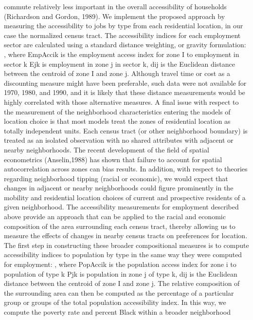 \documentclass[12pt,a4paper]{article}
\begin{document}
commute relatively less important in the overall accessibility of
households (Richardson and Gordon, 1989). We implement the
proposed approach by measuring the accessibility to jobs by type
from each residential location, in our case the normalized census
tract.  The accessibility indices for each employment sector are
calculated using a standard distance weighting, or gravity
formulation:
 ,
where   EmpAccik is the employment access index for zone I to
employment in sector k Ejk is employment in zone j in sector k,
    dij is the Euclidean distance between the centroid of zone I and zone j.
Although travel time or cost as a discounting measure might have
been preferable, such data were not available for 1970, 1980,  and
1990, and it is likely that these distance measurements would be
highly correlated with those alternative measures. A final issue
with respect to the measurement of the neighborhood
characteristics entering the models of location choice is that
most models treat the zones of residential location as totally
independent units.  Each census tract (or other neighborhood
boundary) is treated as an isolated observation with no shared
attributes with adjacent or nearby neighborhoods.  The recent
development of the field of spatial econometrics (Anselin,1988)
has shown that failure to account for spatial autocorrelation
across zones can bias results.  In addition, with respect to
theories regarding neighborhood tipping (racial or economic), we
would expect that changes in adjacent or nearby neighborhoods
could figure prominently in the mobility and residential location
choices of current and prospective residents of a given
neighborhood.  The accessibility measurements for employment
described above provide an approach that can be applied to the
racial and economic composition of the area surrounding each
census tract, thereby allowing us to measure the effects of
changes in nearby census tracts on preferences for location. The
first step in constructing these broader compositional measures is
to compute accessibility indices to population by type in the same
way they were computed for employment:
 ,
where   PopAccik is the population access index for zone i to
population of type k Pjk is population in zone j of type k,
    dij is the Euclidean distance between the centroid of zone I and zone j.
The relative composition of the surrounding area can then be
computed as the percentage of a particular group or groups of the
total population accessibility index.  In this way, we compute the
poverty rate and percent Black within a broader neighborhood
\end{document}
